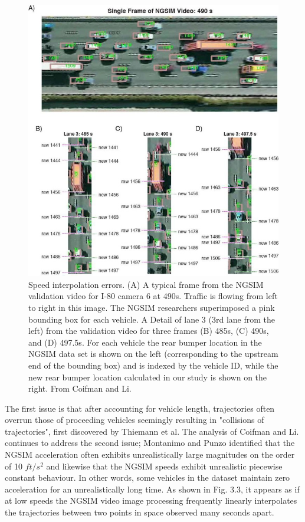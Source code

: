 \documentclass[11pt]{uonthesis}
\begin{document}
\begin{figure}[ht!]
    \centering
    \includegraphics[width=12cm]{images/interpolation.jpg}
    \caption{Speed interpolation errors. (A) A typical frame from the NGSIM validation video for I-80 camera 6 at 490s. Traffic is flowing from left to right in this image. The NGSIM researchers superimposed a pink bounding box for each vehicle. A Detail of lane 3 (3rd lane from the left) from the validation video for three frames (B) 485s, (C) 490s, and (D) 497.5s. For each vehicle the rear bumper location in the NGSIM data set is shown on the left (corresponding to the upstream end of the bounding box) and is indexed by the vehicle ID, while the new rear bumper location calculated in our study is shown on the right. From Coifman and Li. \protect\cite{COIFMAN2017362}}
\end{figure}

The first issue is that after accounting for vehicle length, trajectories often overrun those of proceeding vehicles seemingly resulting in "collisions of trajectories", first discovered by Thiemann et al. \cite{Thiemann_2008} The analysis of Coifman and Li. continues to address the second issue; Montanimo and Punzo \cite{MONTANINO201582} identified that the NGSIM acceleration often exhibits unrealistically large magnitudes on the order of 10 $ft/s^2$ and likewise that the NGSIM speeds exhibit unrealistic piecewise constant behaviour. In other words, some vehicles in the dataset maintain zero acceleration for an unrealistically long time. As shown in Fig. 3.3, %
it appears as if at low speeds the NGSIM video image processing frequently linearly interpolates the trajectories between two points in space observed many seconds apart.
\end{document}
